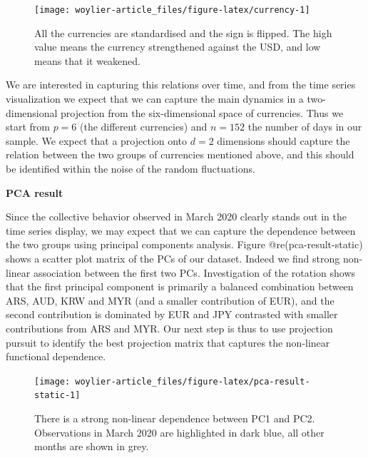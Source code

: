 \begin{Schunk}
\begin{figure}
\texttt{[image: woylier-article\_files/figure-latex/currency-1]} \caption[All the currencies are standardised and the sign is flipped]{All the currencies are standardised and the sign is flipped. The high value means the currency strengthened against the USD, and low means that it weakened.}\label{fig:currency}
\end{figure}
\end{Schunk}

We are interested in capturing this relations over time, and from the
time series visualization we expect that we can capture the main
dynamics in a two-dimensional projection from the six-dimensional space
of currencies. Thus we start from \(p=6\) (the different currencies) and
\(n=152\) the number of days in our sample. We expect that a projection
onto \(d=2\) dimensions should capture the relation between the two
groups of currencies mentioned above, and this should be identified
within the noise of the random fluctuations.

\textbf{PCA result}

Since the collective behavior observed in March 2020 clearly stands out
in the time series display, we may expect that we can capture the
dependence between the two groups using principal components analysis.
Figure @re(pca-result-static) shows a scatter plot matrix of the PCs of
our dataset. Indeed we find strong non-linear association between the
first two PCs. Investigation of the rotation shows that the first
principal component is primarily a balanced combination between ARS,
AUD, KRW and MYR (and a smaller contribution of EUR), and the second
contribution is dominated by EUR and JPY contrasted with smaller
contributions from ARS and MYR. Our next step is thus to use projection
pursuit to identify the best projection matrix that captures the
non-linear functional dependence.

\begin{Schunk}
\begin{figure}

{\centering \texttt{[image: woylier-article\_files/figure-latex/pca-result-static-1]} 

}

\caption[There is a strong non-linear dependence between PC1 and PC2]{There is a strong non-linear dependence between PC1 and PC2. Observations in March 2020 are highlighted in dark blue, all other months are shown in grey.}\label{fig:pca-result-static}
\end{figure}
\end{Schunk}

